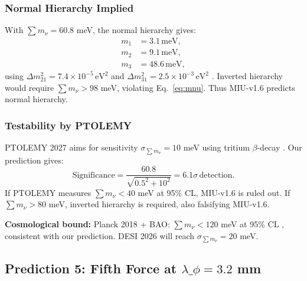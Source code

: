 \documentclass[12pt, a4paper]{article}
\theoremstyle{miuThm}
\theoremstyle{remark}
\begin{document}
\subsubsection{Normal Hierarchy Implied}
With $\sum m_\nu = 60.8$ meV, the normal hierarchy gives:
\begin{align}
m_1 &= 3.1 \, \text{meV}, \nonumber \\
m_2 &= 9.1 \, \text{meV}, \nonumber \\
m_3 &= 48.6 \, \text{meV}, \label{eq:masses}
\end{align}
using $\Delta m_{21}^2 = 7.4 \times 10^{-5} \, \text{eV}^2$ and 
$\Delta m_{31}^2 = 2.5 \times 10^{-3} \, \text{eV}^2$ \cite{PDG2024}. 
Inverted hierarchy would require $\sum m_\nu > 98$ meV, violating Eq.~\eqref{eq:mnu}. 
Thus MIU-v1.6 predicts normal hierarchy.

\subsubsection{Testability by PTOLEMY}
PTOLEMY 2027 aims for sensitivity $\sigma_{\sum m_\nu} = 10$ meV using tritium 
$\beta$-decay \cite{PTOLEMY2023}. Our prediction gives:
\begin{equation}
\text{Significance} = \frac{60.8}{\sqrt{0.5^2 + 10^2}} = 6.1\sigma \, \text{detection}.
\label{eq:sigma_nu}
\end{equation}
If PTOLEMY measures $\sum m_\nu < 40$ meV at 95\% CL, MIU-v1.6 is ruled out. 
If $\sum m_\nu > 80$ meV, inverted hierarchy is required, also falsifying MIU-v1.6.

\textbf{Cosmological bound:} Planck 2018 + BAO: $\sum m_\nu < 120$ meV at 95\% CL 
\cite{Planck2020}, consistent with our prediction. DESI 2026 will reach 
$\sigma_{\sum m_\nu} = 20$ meV.

\subsection{Prediction 5: Fifth Force at $\lambda\_\phi = 3.2$ mm}
\label{subsec:fifthforce}
\end{document}
